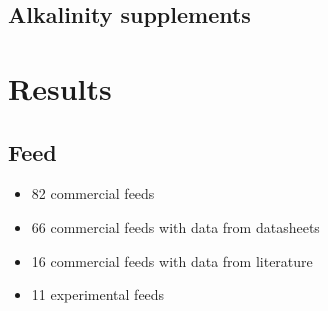 \documentclass[
]{article}
\providecommand{\tightlist}{%
  \setlength{\itemsep}{0pt}\setlength{\parskip}{0pt}}
\begin{document}
\hypertarget{alkalinity-supplements}{%
\subsection{Alkalinity supplements}\label{alkalinity-supplements}}

\newpage

\hypertarget{results}{%
\section{Results}\label{results}}

\hypertarget{feed-1}{%
\subsection{Feed}\label{feed-1}}

\begin{itemize}
\tightlist
\item
  82 commercial feeds
\item
  66 commercial feeds with data from datasheets
\item
  16 commercial feeds with data from literature
\item
  11 experimental feeds
\end{itemize}
\end{document}
